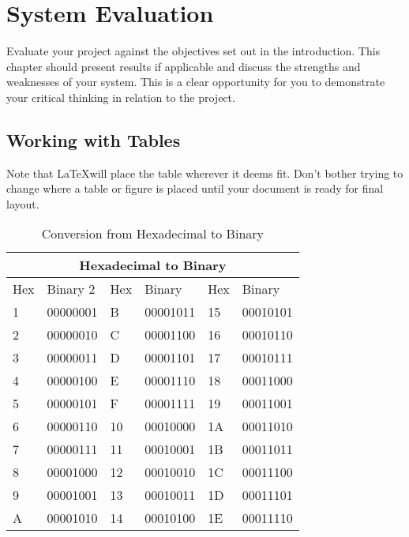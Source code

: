 \chapter{System Evaluation}
Evaluate your project against the objectives set out in the introduction.
This chapter should present results if applicable and discuss the strengths and weaknesses of your system. This is a clear opportunity for you to 
demonstrate your critical thinking in relation to the project. 


\section{Working with Tables}
Note that \LaTeX will place the table wherever it deems fit. Don't bother trying to change where a table or figure is placed until your document is ready for final layout.

\begin{table}
    \begin{tabular}{p{2cm}|p{2cm}|p{2cm}|p{2cm}|p{2cm}|p{2cm}}
        \hline
        \multicolumn{6}{|c|}{Hexadecimal to Binary} \\
        \hline
        Hex & Binary 2 & Hex & Binary & Hex & Binary\\
        \hline
        \hline
        1 & 00000001 & B & 00001011 & 15 & 00010101 \\
        2 & 00000010 & C & 00001100 & 16 & 00010110 \\
        3 & 00000011 & D & 00001101 & 17 & 00010111 \\
        4 & 00000100 & E & 00001110 & 18 & 00011000 \\
        5 & 00000101 & F & 00001111 & 19 & 00011001 \\
        6 & 00000110 & 10 & 00010000 & 1A & 00011010 \\
        7 & 00000111 & 11 & 00010001 & 1B & 00011011 \\
        8 & 00001000 & 12 & 00010010 & 1C & 00011100 \\
        9 & 00001001 & 13 & 00010011 & 1D & 00011101 \\
        A & 00001010 & 14 & 00010100 & 1E & 00011110 \\
        \hline
    \end{tabular}
    \caption{Conversion from Hexadecimal to Binary}
    \label{table:HexToBin}
\end{table}